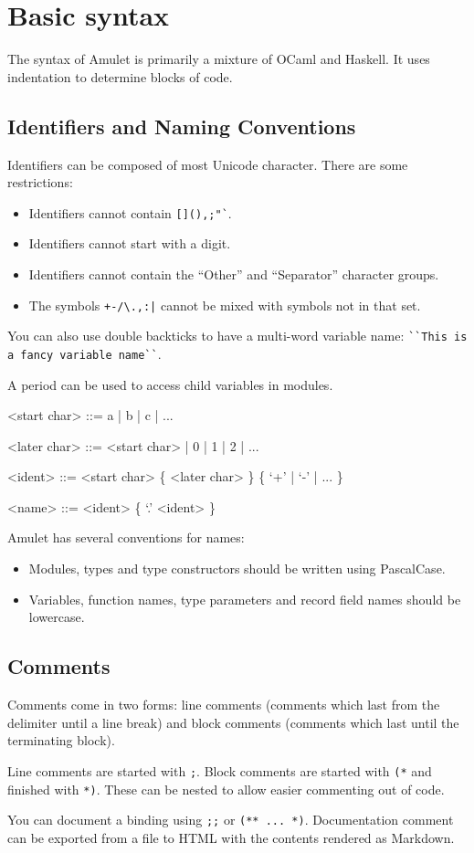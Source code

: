 \section{Basic syntax}

The syntax of Amulet is primarily a mixture of OCaml and Haskell. It uses indentation to determine blocks of code.

\subsection{Identifiers and Naming Conventions}
Identifiers can be composed of most Unicode character. There are some restrictions:

\begin{itemize}
\item Identifiers cannot contain \texttt{[](){},;"\`{}\textquotesingle}.
\item Identifiers cannot start with a digit.
\item Identifiers cannot contain the ``Other'' and ``Separator''\cite{unicodeCats}\cite{unicodeData} character groups.
\item The symbols \texttt{+-/\textbackslash*.,:|} cannot be mixed with symbols not in that set.
\end{itemize}

You can also use double backticks to have a multi-word variable name: \texttt{\`{}\`{}This is a fancy variable name\`{}\`{}}.

A period can be used to access child variables in modules.

\begin{grammar}
<start char>  ::= a | b | c | ...

<later char>  ::= <start char> | 0 | 1 | 2 | ...

<ident>       ::= <start char> \{ <later char> \}
             \alt \{ `+' | `-' | ... \}

<name>        ::= <ident> \{ `.' <ident> \}
\end{grammar}

Amulet has several conventions for names:
\begin{itemize}
\item Modules, types and type constructors should be written using PascalCase.
\item Variables, function names, type parameters and record field names should be lowercase.
\end{itemize}

\subsection{Comments}
Comments come in two forms: line comments (comments which last from the delimiter until a line break) and block comments (comments which last until the terminating block).

Line comments are started with \texttt{;}.
Block comments are started with \texttt{(*} and finished with \texttt{*)}. These can be nested to allow easier commenting out of code.

You can document a binding using \texttt{;;} or \texttt{(** ... *)}. Documentation comment can be exported from a file to HTML with the contents rendered as Markdown.
